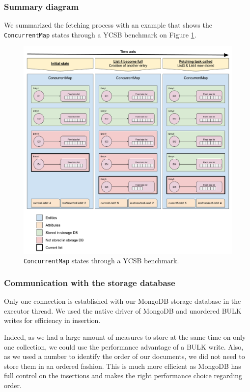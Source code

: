 \documentclass[a4paper,11pt]{report}
\begin{document}
\subsubsection{Summary diagram}

We summarized the fetching process with an example that shows the \texttt{ConcurrentMap} states through a YCSB benchmark on Figure \ref{concurrent_map_scheme}.

\begin{figure}[ht]
\begin{center}
\includegraphics[width=1\linewidth]{images/concurrent_map_scheme.png}
\caption{\texttt{ConcurrentMap} states through a YCSB benchmark.}
\label{concurrent_map_scheme}
\end{center}
\end{figure}

\subsubsection{Communication with the storage database}

Only one connection is established with our MongoDB storage database in the executor thread. We used the native driver of MongoDB and unordered BULK writes for efficiency in insertion.

Indeed, as we had a large amount of measures to store at the same time on only one collection, we could use the performance advantage of a BULK write. Also, as we used a number to identify the order of our documents, we did not need to store them in an ordered fashion. This is much more efficient as MongoDB has full control on the insertions and makes the right performance choice regarding order. 
\end{document}
